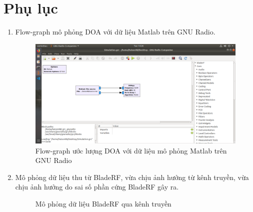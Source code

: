 \clearpage
{}

\chapter*{Phụ lục}
\renewcommand{\thefigure}{A.\arabic{figure}} 
\setcounter{figure}{0}
\begin{enumerate}[A$).$]
	\item {Flow-graph mô phỏng DOA với dữ liệu Matlab trên GNU Radio.
			\par
			\begin{figure} [!h]
			\centering
			\includegraphics[width=1\linewidth]{figures/simulation1.png}
			\caption{Flow-graph ước lượng DOA với dữ liệu mô phỏng Matlab trên GNU Radio}
			\label{fig:simulation1}
			\end{figure} 
			\newpage}
	\item {
		Mô phỏng dữ liệu thu từ BladeRF, vừa chịu ảnh hưởng từ kênh truyền, vừa chịu ảnh hưởng do sai số phần cứng BladeRF gây ra.
		\renewcommand{\thefigure}{B.\arabic{figure}} 
		\setcounter{figure}{0}
		 \begin{figure}[!ht]
			\centering
			\hfill
			\hfill
			\caption{Mô phỏng dữ liệu BladeRF qua kênh truyền}
			\label{fig:bladesimu}
		\end{figure}
	\newpage
	}


\end{enumerate}
